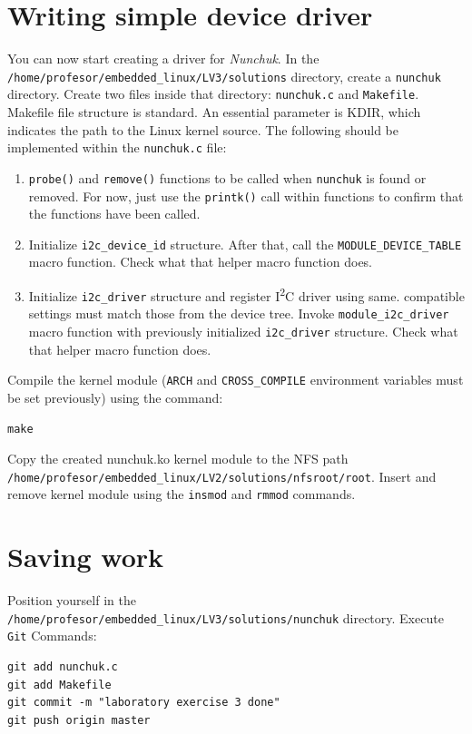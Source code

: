 \documentclass[11pt]{article}
\begin{document}
\section{Writing simple device driver}
You can now start creating a driver for \textit{Nunchuk}. In the
\texttt{/home/profesor/embedded\_linux/LV3/solutions} directory, create a
\texttt{nunchuk} directory. Create two files inside that directory:
 \texttt{nunchuk.c} and \texttt{Makefile}.
\newline
\newline
Makefile file structure is standard. An essential parameter is KDIR, which
 indicates the path to the Linux kernel source.
\newline
\newline
The following should be implemented within the \texttt{nunchuk.c} file:
\begin{enumerate}
	\item \texttt{probe()} and \texttt{remove()} functions to be called when
		\texttt{nunchuk} is found or removed. For now, just use the
		\texttt{printk()} call within functions to confirm that the functions
		have been called.
	\item Initialize \texttt{i2c\_device\_id} structure. After that, call the
		\texttt{MODULE\_DEVICE\_TABLE} macro function. Check what that helper
		macro function does.
	\item Initialize \texttt{i2c\_driver} structure and register
		I\textsuperscript{2}C driver using same. compatible settings must match
		those from the device tree. Invoke \texttt{module\_i2c\_driver} macro
		function with previously initialized \texttt{i2c\_driver} structure.
		Check what that helper macro function does.
\end{enumerate}
Compile the kernel module (\texttt{ARCH} and \texttt{CROSS\_COMPILE} environment
 variables must be set previously) using the command:
\begin{lstlisting}
make
\end{lstlisting}
Copy the created nunchuk.ko kernel module to the NFS path\\
\texttt{/home/profesor/embedded\_linux/LV2/solutions/nfsroot/root}. Insert and
 remove kernel module using the \texttt{insmod} and \texttt{rmmod} commands.

\section{Saving work}
Position yourself in the \texttt{/home/profesor/embedded\_linux/LV3/solutions/nunchuk}
 directory.
Execute \texttt{Git} Commands:
\begin{lstlisting}
git add nunchuk.c
git add Makefile
git commit -m "laboratory exercise 3 done"
git push origin master
\end{lstlisting}
\end{document}
